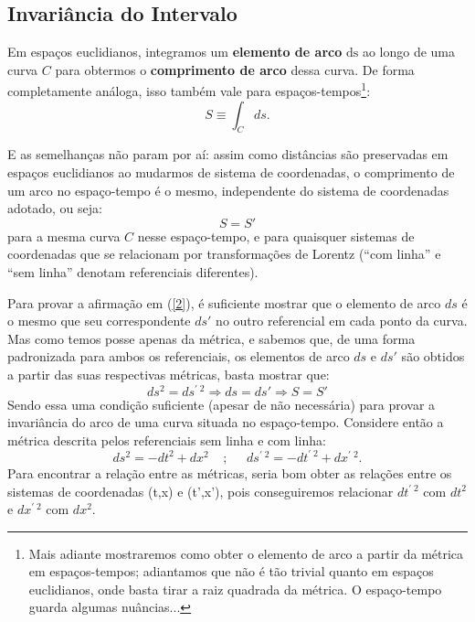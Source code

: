 \documentclass[12pt,a4paper]{article}
\begin{document}
\subsection{Invariância do Intervalo}

Em espaços euclidianos, integramos um \textbf{elemento de arco} $\mathrm{ds}$
ao longo de uma curva $C$ para obtermos o \textbf{comprimento de arco} dessa curva. De forma completamente análoga,
isso também vale para espaços-tempos\footnote{Mais adiante mostraremos como obter o elemento de arco a partir da métrica em espaços-tempos; adiantamos que não é tão trivial quanto em espaços euclidianos, onde basta tirar a raiz quadrada da métrica. O espaço-tempo guarda algumas nuâncias...}:
\begin{equation}
  S \equiv \int_{C} ds .
\end{equation}

E as semelhanças não param por aí: assim como distâncias são preservadas em espaços euclidianos ao mudarmos de sistema de coordenadas, o comprimento
de um arco no espaço-tempo é o mesmo, independente do sistema de coordenadas adotado, ou seja:
\begin{equation}
  S = S' 
  \label{2}
\end{equation}
para a mesma curva $C$ nesse espaço-tempo, e para quaisquer sistemas de coordenadas que se relacionam por
transformações de Lorentz (\enquote{com linha} e \enquote{sem linha} denotam referenciais diferentes). 

Para provar a afirmação em (\ref{2}), é suficiente mostrar que o elemento
de arco $ds$ é o mesmo que seu correspondente $ds'$ no outro referencial em cada ponto da curva. Mas como temos posse apenas da métrica,
e sabemos que, de uma forma padronizada para ambos os referenciais, os elementos de arco $ds$ e $ds'$ são obtidos a partir das suas respectivas métricas, basta mostrar que:
\begin{equation*}
  ds^2 = ds^{\prime \; 2} \Rightarrow ds = ds' \Rightarrow S = S'
\end{equation*}
Sendo essa uma condição suficiente (apesar de não necessária) para provar a invariância do arco de uma curva situada no
espaço-tempo. 
Considere então a métrica descrita pelos referenciais sem linha e com linha:
\begin{equation}
  ds^2 = -dt^2 + dx^2 \;\;\;\;;\;\;\;\;\; ds^{\prime\; 2} = -dt^{\prime\; 2} + dx^{\prime\; 2}.
  \label{eq:intervalos}
\end{equation}
Para encontrar a relação entre as métricas, seria bom obter as relações entre os sistemas de coordenadas (t,x) e (t',x'),
pois conseguiremos relacionar $dt^{\prime \; 2}$ com $dt^2$ e $dx^{\prime \; 2}$ com $dx^2$.
\end{document}
